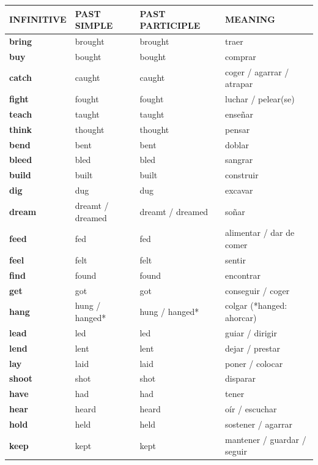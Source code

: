 \documentclass[11pt,a4paper]{article}
\newcommand{\cab}[1]{\rowcolor{#1O}\small\textbf{\color{white}INFINITIVE} & \small\textbf{\color{white}PAST SIMPLE} & \small\textbf{\color{white}PAST\,PARTICIPLE} & \small\textbf{\color{white}MEANING}\\}
\begin{document}
\begin{longtable}{|>{\bfseries}p{2.8cm}|p{3.5cm}|p{3.7cm}|>{\raggedright\arraybackslash}p{6.6cm}|}
\hline
\cab{verde}\hline\endhead
\rowcolor{verdeC} bring & brought & brought & traer\\ \hline
\rowcolor{verdeC} buy & bought & bought & comprar\\ \hline
\rowcolor{verdeC} catch & caught & caught & coger / agarrar / atrapar\\ \hline
\rowcolor{verdeC} fight & fought & fought & luchar / pelear(se)\\ \hline
\rowcolor{verdeC} teach & taught & taught & enseñar\\ \hline
\rowcolor{verdeC} think & thought & thought & pensar\\ \hline
\rowcolor{verdeC} bend & bent & bent & doblar\\ \hline
\rowcolor{verdeC} bleed & bled & bled & sangrar\\ \hline
\rowcolor{verdeC} build & built & built & construir\\ \hline
\rowcolor{verdeC} dig & dug & dug & excavar\\ \hline
\rowcolor{verdeC} dream & dreamt / dreamed & dreamt / dreamed & soñar\\ \hline
\rowcolor{verdeC} feed & fed & fed & alimentar / dar de comer\\ \hline
\rowcolor{verdeC} feel & felt & felt & sentir\\ \hline
\rowcolor{verdeC} find & found & found & encontrar\\ \hline
\rowcolor{verdeC} get & got & got & conseguir / coger\\ \hline
\rowcolor{verdeC} hang & hung / hanged* & hung / hanged* & colgar (*hanged: ahorcar)\\ \hline
\rowcolor{verdeC} lead & led & led & guiar / dirigir\\ \hline
\rowcolor{verdeC} lend & lent & lent & dejar / prestar\\ \hline
\rowcolor{verdeC} lay & laid & laid & poner / colocar\\ \hline
\rowcolor{verdeC} shoot & shot & shot & disparar\\ \hline
\rowcolor{verdeC} have & had & had & tener\\ \hline
\rowcolor{verdeC} hear & heard & heard & oír / escuchar\\ \hline
\rowcolor{verdeC} hold & held & held & sostener / agarrar\\ \hline
\rowcolor{verdeC} keep & kept & kept & mantener / guardar / seguir\\ \hline

\end{longtable}
\end{document}
